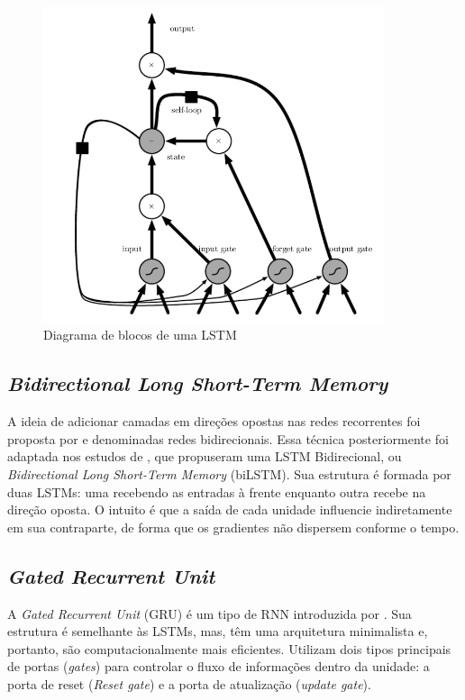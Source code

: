 \begin{figure}[!htb] \centering
  \caption{Diagrama de blocos de uma LSTM} \label{figura:lstm}
  \begin{varwidth}{\linewidth}
    \includegraphics[width=10cm]{figuras/lstm.png}
  \end{varwidth}
\end{figure}

\subsection{\textit{Bidirectional Long Short-Term Memory}} \label{sec:bilstm}

A ideia de adicionar camadas em direções opostas nas redes recorrentes foi proposta por \textcite{Schuster} e denominadas redes bidirecionais.
Essa técnica posteriormente foi adaptada nos estudos de \textcite{bilstm}, que propuseram uma LSTM Bidirecional, ou \textit{Bidirectional Long Short-Term Memory} (biLSTM).
Sua estrutura é formada por duas LSTMs: 
uma recebendo as entradas à frente enquanto outra recebe na direção oposta.
O intuito é que a saída de cada unidade influencie indiretamente em sua contraparte, de forma que os gradientes não dispersem conforme o tempo.


\subsection{\textit{Gated Recurrent Unit}} \label{sec:gru}
A \textit{Gated Recurrent Unit} (GRU) é um tipo de RNN introduzida por \textcite{Cho}.
Sua estrutura é semelhante às LSTMs, mas, têm uma arquitetura minimalista e, portanto, são computacionalmente mais eficientes. 
Utilizam dois tipos principais de portas (\textit{gates}) para controlar o fluxo de informações dentro da unidade: a porta de reset (\textit{Reset gate}) e a porta de atualização (\textit{update gate}).

